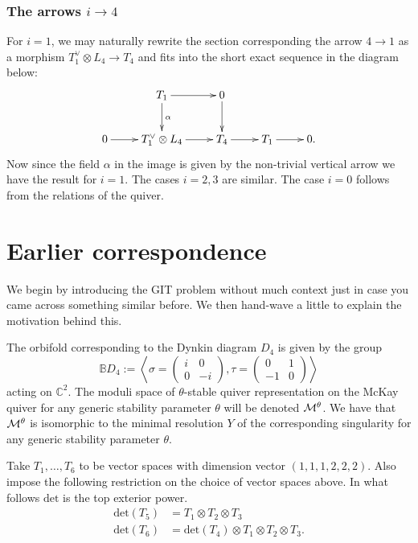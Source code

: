 \documentclass{amsart}
\theoremstyle{definition}
\begin{document}
\subsubsection{The arrows $i \rightarrow 4$}

For $i =1$, we may naturally rewrite the section corresponding the arrow $4 \rightarrow 1$ as a morphism $T_1^\vee \otimes L_4 \rightarrow T_4$ and fits into the short exact sequence in the diagram below:
\begin{equation}
    \xymatrix{ & T_1 \ar[r] \ar[d]^\alpha & 0 \ar[d] & \\
    0 \ar[r] & T_1^\vee \otimes L_4 \ar[r] & T_4 \ar[r] & T_1 \ar[r] & 0.} 
\end{equation}
Now since the field $\alpha$ in the image is given by the non-trivial vertical arrow we have the result for $i=1$.
The cases $i=2,3$ are similar.
The case $i=0$ follows from the relations of the quiver.

\section{Earlier correspondence}

We begin by introducing the GIT problem without much context just in case you came across something similar before.
We then hand-wave a little to explain the motivation behind this.

The orbifold corresponding to the Dynkin diagram $D_4$ is given by the group 
\[
\mathbb{B}D_4:= \left\langle \sigma=\left(\begin{array}{cc} i & 0 \\ 0 & -i \end{array} \right), \tau=\left( \begin{array}{cc} 0 & 1 \\ -1 & 0 \end{array} \right) \right\rangle
\]
acting on $\mathbb{C}^2$. 
The moduli space of $\theta$-stable quiver representation on the McKay quiver for any generic stability parameter $\theta$ will be denoted $\mathcal{M}^\theta$.
We have that $\mathcal{M}^\theta$ is isomorphic to the minimal resolution $Y$ of the corresponding singularity for any generic stability parameter $\theta$.

Take $T_1, \ldots, T_6$ to be vector spaces with dimension vector $(1,1,1,2,2,2)$.
Also impose the following restriction on the choice of vector spaces above.
In what follows $\text{det}$ is the top exterior power.
\begin{align*}
    \text{det}(T_5) &= T_1 \otimes T_2 \otimes T_3 \\
    \text{det}(T_6) &= \text{det}(T_4) \otimes T_1 \otimes T_2 \otimes T_3.
\end{align*}
\end{document}
